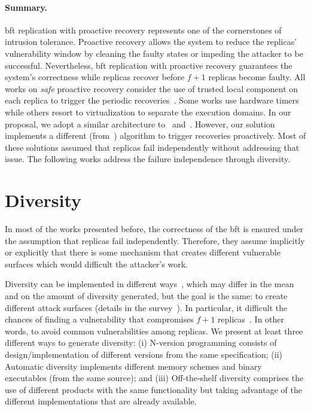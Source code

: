 \paragraph{Summary.} \gls{bft} replication with proactive recovery represents one of the cornerstones of intrusion tolerance. 
Proactive recovery allows the system to reduce the replicas' vulnerability window by cleaning the faulty states or impeding the attacker to be successful. 
Nevertheless, \gls{bft} replication with proactive recovery guarantees the system's correctness while replicas recover before $f+1$ replicas become faulty. 
All works on \emph{safe} proactive recovery consider the use of trusted local component on each replica to trigger the periodic recoveries~\cite{Castro:2002,Sousa:2010,Roeder:2010,Platania:2014,Distler:2011}.
Some works use hardware timers while others resort to virtualization to separate the execution domains. 
In our proposal, we adopt a similar architecture to~\cite{Distler:2008} and~\cite{Sousa:2010}. 
However, our solution implements a different (from~\cite{Sousa:2010}) algorithm to trigger recoveries proactively.
Most of these solutions assumed that replicas fail independently without addressing that issue. 
The following works address the failure independence through diversity. 




\section{Diversity}
In most of the works presented before, the correctness of the \gls{bft} is ensured under the assumption that replicas fail independently.
Therefore, they assume implicitly or explicitly that there is some mechanism that creates different vulnerable surfaces which would difficult the attacker's work.

Diversity can be implemented in different ways~\cite{Deswarte:1998,Larsen:2015}, which may differ in the mean and on the amount of diversity generated, but the goal is the same: to create different attack surfaces (details in the survey~\cite{Baudry:2015}).
In particular, it difficult the chances of finding a vulnerability that compromises $f+1$ replicas~\cite{Castro:2002}.
In other words, to avoid common vulnerabilities among replicas. 
We present at least three different ways to generate diversity: 
(i) N-version programming consists of design/implementation of different versions from the same specification; 
(ii) Automatic diversity implements different memory schemes and binary executables (from the same source); 
and (iii) Off-the-shelf diversity comprises the use of different products with the same functionality but taking advantage of the different implementations that are already available.


